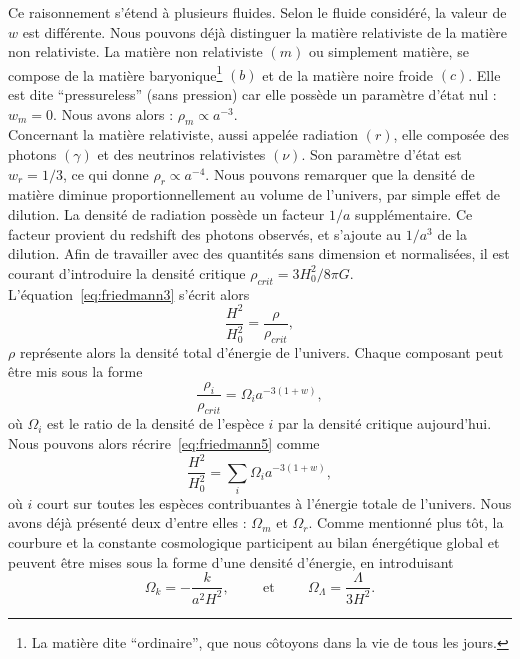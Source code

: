 \documentclass[11pt, twoside, a4paper, openright]{report}
\begin{document}
Ce raisonnement s'étend à plusieurs fluides. Selon le fluide considéré, la valeur de $w$ est différente. Nous pouvons déjà distinguer la matière relativiste de la matière non relativiste. La matière non relativiste $(m)$ ou simplement matière, se compose de la matière baryonique\footnote{La matière dite ``ordinaire'', que nous côtoyons dans la vie de tous les jours.} $(b)$ et de la matière noire froide $(c)$. Elle est dite ``pressureless'' (sans pression) car elle possède un paramètre d'état nul : $w_m = 0$. Nous avons alors : $\rho_m \propto a^{-3}$. \\
Concernant la matière relativiste, aussi appelée radiation $(r)$, elle composée des photons $(\gamma)$ et des neutrinos relativistes $(\nu)$. Son paramètre d'état est $w_r = 1/3$, ce qui donne $\rho_r \propto a^{-4}$. Nous pouvons remarquer que la densité de matière diminue proportionnellement au volume de l'univers, par simple effet de dilution. La densité de radiation possède un facteur $1/a$ supplémentaire. Ce facteur provient du redshift des photons observés, et s'ajoute au $1/a^3$ de la dilution.
Afin de travailler avec des quantités sans dimension et normalisées, il est courant d'introduire la densité critique $\rho_{crit} = 3 H_0^2 / 8 \pi G$. L'équation~\ref{eq:friedmann3} s'écrit alors
\begin{equation}
  \label{eq:friedmann5}
  \frac{H^2}{H_0^2} = \frac{\rho}{\rho_{crit}} ,
\end{equation}
$\rho$ représente alors la densité total d'énergie de l'univers. Chaque composant peut être mis sous la forme
\begin{equation}
  \label{eq:def_omgega}
  \frac{\rho_i}{\rho_{crit}} = \Omega_i a^{-3 (1+w)} , 
\end{equation}
où $\Omega_i$ est le ratio de la densité de l'espèce $i$ par la densité critique aujourd'hui. Nous pouvons alors récrire~\ref{eq:friedmann5} comme
\begin{equation}
  \label{eq:friedmann6}
  \frac{H^2}{H_0^2} = \sum_i \Omega_i a^{-3 (1+w)} ,
\end{equation}
où $i$ court sur toutes les espèces contribuantes à l'énergie totale de l'univers. Nous avons déjà présenté deux d'entre elles : $\Omega_m$ et $\Omega_r$. Comme mentionné plus tôt, la courbure et la constante cosmologique participent au bilan énergétique global et peuvent être mises sous la forme d'une densité d'énergie, en introduisant
\begin{equation}
  \label{eq:omega_lambda}
  \Omega_{k} = - \frac{k}{a^2 H^2} , \hspace{1cm} \textrm{et} \hspace{1cm} \Omega_{\Lambda} = \frac{\Lambda}{3 H^2} .
\end{equation}
\end{document}
